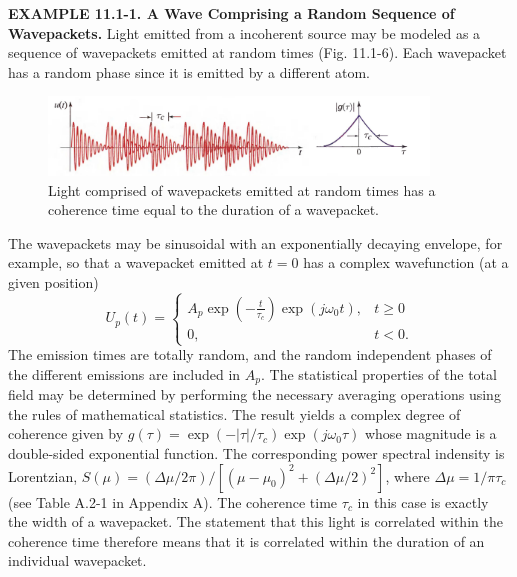 \documentclass{article}
\newcommand\crule[3][black]{\textcolor{#1}{\rule{#2}{#3}}}
\numberwithin{figure}{subsection}
\numberwithin{table}{subsection}
\begin{document}
\noindent{\crule[ksc]{\textwidth}{0.1cm}}
\textbf{EXAMPLE 11.1-1. A Wave Comprising a Random Sequence of Wavepackets.} Light emitted from a incoherent source may be modeled as a sequence of wavepackets emitted at random times (Fig. 11.1-6). Each wavepacket has a random phase since it is emitted by a different atom.
\begin{figure}[H]
\centering
\includegraphics[width=0.9\textwidth]{11_1_6.PNG}
\caption{Light comprised of wavepackets emitted at random times has a coherence time equal to the duration of a wavepacket.}
\label{fig: 11_1_6}
\end{figure}
The wavepackets may be sinusoidal with an exponentially decaying envelope, for example, so that
a wavepacket emitted at $ t = 0 $ has a complex wavefunction (at a given position)
\begin{equation}
U_p(t) = 
\begin{cases}
A_p \exp(-\frac{t}{\tau_c}) \exp(j \omega_0 t), & t\geq 0 \\
0, & t < 0 .
\end{cases}
\end{equation}
The emission times are totally random, and the random independent phases of the different emissions are included in $ A_p $. The statistical properties of the total field may be determined by performing the necessary averaging operations using the rules of mathematical statistics. The result yields a complex degree of coherence given by $ g(\tau) = \exp(- \lvert \tau \rvert / \tau_c) \exp(j \omega_0 \tau) $ whose magnitude is a double-sided exponential function. The corresponding power spectral indensity is Lorentzian, $ S(\mu) = (\Delta \mu /2 \pi)/ [(\mu - \mu_0)^2 + (\Delta \mu /2)^2] $, where $ \Delta \mu = 1/ \pi \tau_c $ (see Table A.2-1 in Appendix A). The coherence time $ \tau_c $ in this case is exactly the width of a wavepacket. The statement that this light is correlated within the coherence time therefore means that it is correlated within the duration of an individual wavepacket.\\
\noindent{\crule[ksc]{\textwidth}{0.1cm}}

\bigbreak\begingroup
\color{ksc}
\end{document}
